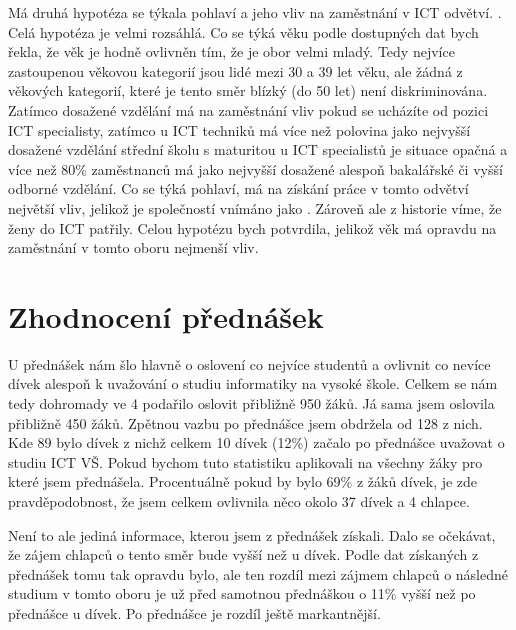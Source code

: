 \documentclass[12pt]{report}			%
\begin{document}
            Má druhá hypotéza se týkala pohlaví a jeho vliv na zaměstnání v ICT odvětví. . Celá hypotéza je velmi rozsáhlá. Co se týká věku podle dostupných dat bych řekla, že věk je hodně ovlivněn tím, že je obor velmi mladý. Tedy nejvíce zastoupenou věkovou kategorií jsou lidé mezi 30 a 39 let věku, ale žádná z věkových kategorií, které je tento směr blízký (do 50 let) není diskriminována. Zatímco dosažené vzdělání má na zaměstnání vliv pokud se ucházíte od pozici ICT specialisty, zatímco u ICT techniků má více než polovina jako nejvyšší dosažené vzdělání střední školu s maturitou u ICT specialistů je situace opačná a více než 80\% zaměstnanců má jako nejvyšší dosažené alespoň bakalářské či vyšší odborné vzdělání. Co se týká pohlaví, má na získání práce v tomto odvětví největší vliv, jelikož je společností vnímáno jako . Zároveň ale z historie víme, že ženy do ICT patřily. Celou hypotézu bych potvrdila, jelikož věk má opravdu na zaměstnání v tomto oboru nejmenší vliv.
	    
	    \section{Zhodnocení přednášek}
            
            U přednášek nám šlo hlavně o oslovení co nejvíce studentů a ovlivnit co nevíce dívek alespoň k uvažování o studiu informatiky na vysoké škole. \textit{} Celkem se nám tedy dohromady ve 4 podařilo oslovit přibližně 950 žáků. Já sama jsem oslovila přibližně 450 žáků. Zpětnou vazbu po přednášce jsem obdržela od 128 z nich. Kde 89 bylo dívek z nichž celkem 10 dívek (12\%) začalo po přednášce uvažovat o studiu ICT VŠ. Pokud bychom tuto statistiku aplikovali na všechny žáky pro které jsem přednášela. Procentuálně pokud by bylo 69\% z žáků dívek, je zde pravděpodobnost, že jsem celkem ovlivnila něco okolo 37 dívek a 4 chlapce. 
            
            Není to ale jediná informace, kterou jsem z přednášek získali. Dalo se očekávat, že zájem chlapců o tento směr bude vyšší než u dívek. Podle dat získaných z přednášek tomu tak opravdu bylo, ale ten rozdíl mezi zájmem chlapců o následné studium v tomto oboru je už před samotnou přednáškou o 11\% vyšší než po přednášce u dívek. Po přednášce je rozdíl ještě markantnější. 
            
\end{document}
